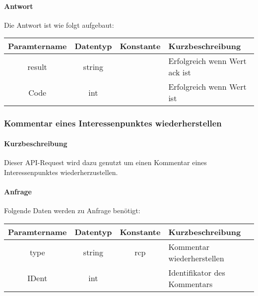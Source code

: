 \paragraph{Antwort}Die Antwort ist wie folgt aufgebaut:
\begin{table}[H]
	\begin{tabular}{|c|c|c|p{6.5cm}|}
		\hline
		\textbf{Paramtername} & \textbf{Datentyp} & \textbf{Konstante} & \textbf{Kurzbeschreibung}                                                                                               \\ \hline
		result              & string           &                 & Erfolgreich wenn Wert {\glqq ack\grqq} ist \\ \hline
		Code                & int              &                 & Erfolgreich wenn Wert {\glqq 0\grqq} ist \\ \hline
	\end{tabular}
\end{table}
\subsubsection{Kommentar eines Interessenpunktes wiederherstellen}
\paragraph{Kurzbeschreibung}Dieser API-Request wird dazu genutzt um einen Kommentar eines Interessenpunktes wiederherzustellen.
\paragraph{Anfrage}Folgende Daten werden zu Anfrage benötigt:
\begin{table}[H]
	\begin{tabular}{|c|c|c|p{6.5cm}|}
		\hline
		\textbf{Paramtername} & \textbf{Datentyp} & \textbf{Konstante} & \textbf{Kurzbeschreibung}                                                                                               \\ \hline
		type                & string            & rcp                & Kommentar wiederherstellen \\ \hline
		IDent               & int               &                    & Identifikator des Kommentars \\ \hline
	\end{tabular}
\end{table}
